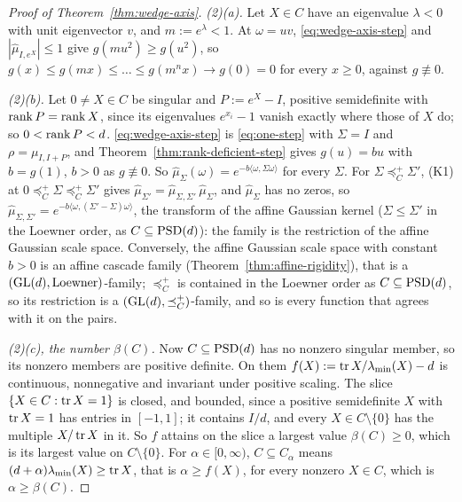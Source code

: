\begin{proof}[Proof of Theorem~\ref{thm:wedge-axis}]
\emph{(2)(a).} Let $X \in C$ have an eigenvalue $\lambda < 0$ with unit eigenvector $v$, and $m := e^\lambda < 1$.
At $\omega = uv$, \ref{eq:wedge-axis-step} and $|\widehat\mu_{I,e^X}| \le 1$ give $g(mu^2) \ge g(u^2)$, so $g(x) \le g(mx) \le
\dots \le g(m^nx) \to g(0) = 0$ for every $x \ge 0$, against $g \not\equiv 0$.

\emph{(2)(b).} Let $0 \ne X \in C$ be singular and $P := e^X - I$, positive semidefinite with $\operatorname{rank} P =
\operatorname{rank} X$, since its eigenvalues $e^{x_i} - 1$ vanish exactly where those of $X$ do; so $0 < \operatorname{rank} P < d$. \ref{eq:wedge-axis-step}
is \ref{eq:one-step} with $\Sigma = I$ and $\rho = \mu_{I,I+P}$, and Theorem~\ref{thm:rank-deficient-step} gives
$g(u) = bu$ with $b = g(1)$, $b > 0$ as $g \not\equiv 0$. So $\widehat\mu_\Sigma(\omega) =
e^{-b\langle\omega,\Sigma\omega\rangle}$ for every $\Sigma$. For $\Sigma \preceq^+_C \Sigma'$, (K1) at
$0 \preceq^+_C \Sigma \preceq^+_C \Sigma'$ gives $\widehat\mu_{\Sigma'} = \widehat\mu_{\Sigma,\Sigma'}\,\widehat\mu_\Sigma$,
and $\widehat\mu_\Sigma$ has no zeros, so $\widehat\mu_{\Sigma,\Sigma'} = e^{-b\langle\omega,(\Sigma'-\Sigma)\omega\rangle}$,
the transform of the affine Gaussian kernel ($\Sigma \le \Sigma'$ in the Loewner order, as
$C \subseteq \mathrm{PSD}(d)$): the family is the restriction of the affine Gaussian scale space. Conversely, the affine
Gaussian scale space with constant $b > 0$ is an affine cascade family (Theorem~\ref{thm:affine-rigidity}), that is a
$(\mathrm{GL}(d), \text{Loewner})$-family; $\preceq^+_C$ is contained in the Loewner order as $C \subseteq \mathrm{PSD}(d)$, so
its restriction is a $(\mathrm{GL}(d), \preceq^+_C)$-family, and so is every function that agrees with it on the pairs.

\emph{(2)(c), the number $\beta(C)$.} Now $C \subseteq \mathrm{PSD}(d)$ has no nonzero singular member, so its nonzero
members are positive definite. On them $f(X) := \operatorname{tr} X/\lambda_{\min}(X) - d$ is continuous,
nonnegative and invariant under positive scaling. The slice $\{X \in C : \operatorname{tr} X = 1\}$ is closed, and bounded,
since a positive semidefinite $X$ with $\operatorname{tr} X = 1$ has entries in $[-1, 1]$; it contains $I/d$, and every
$X \in C \setminus \{0\}$ has the multiple $X/\operatorname{tr} X$ in it. So $f$ attains on the slice a largest value
$\beta(C) \ge 0$, which is its largest value on $C \setminus \{0\}$. For $\alpha \in [0, \infty)$,
$C \subseteq C_\alpha$ means $(d+\alpha)\lambda_{\min}(X) \ge \operatorname{tr} X$, that is $\alpha \ge f(X)$, for every nonzero
$X \in C$, which is $\alpha \ge \beta(C)$.


\end{proof}
